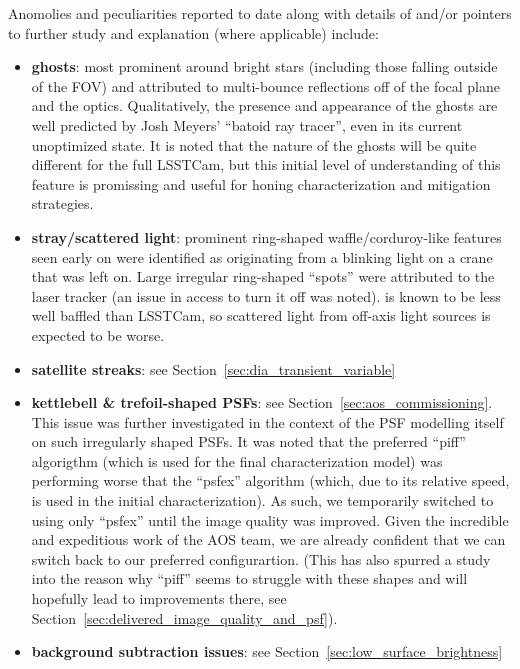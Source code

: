 Anomolies and peculiarities reported to date along with details of and/or pointers
to further study and explanation (where applicable) include:
\begin{itemize}

\item \textbf{ghosts}: most prominent around bright stars (including those falling
  outside of the FOV) and attributed to multi-bounce reflections off of the focal
  plane and the \ComCam optics.  Qualitatively, the presence and appearance of 
  the ghosts are well predicted by Josh Meyers' ``batoid ray tracer'', even in its
  current unoptimized state.  It is noted that the nature of the ghosts will be
  quite different for the full LSSTCam, but this initial level of understanding
  of this feature is promissing and useful for honing characterization and
  mitigation strategies.

\item \textbf{stray/scattered light}: prominent ring-shaped waffle/corduroy-like
  features seen early on were identified as originating from a blinking light on a
  crane that was left on. Large irregular ring-shaped ``spots'' were attributed to
  the laser tracker (an issue in access to turn it off was noted). \ComCam is 
  known to be less well baffled than LSSTCam, so scattered light from off-axis light 
  sources is expected to be worse.

\item \textbf{satellite streaks}: see Section~\ref{sec:dia_transient_variable}

\item \textbf{kettlebell \& trefoil-shaped PSFs}: see Section~\ref{sec:aos_commissioning}.
  This issue was further investigated in the context of the PSF modelling itself on such
  irregularly shaped PSFs.  It was noted that the preferred ``piff'' algorigthm (which
  is used for the final characterization model) was performing worse that the ``psfex''
  algorithm (which, due to its relative speed, is used in the initial characterization).
  As such, we temporarily switched to using only ``psfex'' until the image quality was
  improved.  Given the incredible and expeditious work of the AOS team, we are already
  confident that we can switch back to our preferred configurartion.  (This has also
  spurred a study into the reason why ``piff'' seems to struggle with these shapes and
  will hopefully lead to improvements there, see
  Section~\ref{sec:delivered_image_quality_and_psf}).

\item \textbf{background subtraction issues}: see Section~\ref{sec:low_surface_brightness}


\end{itemize}
